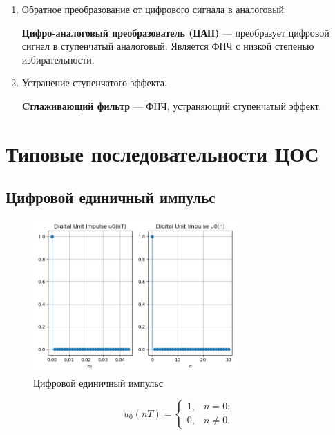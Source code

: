 \documentclass[a4paper, 14pt]{extarticle}
\begin{document}
\begin{enumerate}
    \item Обратное преобразование от цифрового сигнала в аналоговый

        \textbf{Цифро-аналоговый преобразователь (ЦАП)} --- преобразует цифровой сигнал в ступенчатый аналоговый. Является ФНЧ с низкой степенью избирательности.
    \item Устранение ступенчатого эффекта.

        \textbf{Cглаживающий фильтр} --- ФНЧ, устраняющий ступенчатый эффект. 
\end{enumerate}

\section{Типовые последовательности ЦОС}
\subsection{Цифровой единичный импульс}
\begin{figure}[h]
    \centering
    \includegraphics[width=0.7\textwidth]{img/signals/1.png}
    \caption{Цифровой единичный импульс}%
\end{figure}
\begin{equation}
    u_0 (nT) = \begin{cases}
        1, &n = 0;\\
        0, &n \ne 0.
    \end{cases}
\end{equation}

\clearpage
\end{document}
